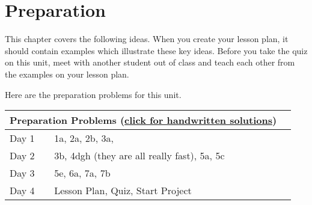 \section{Preparation}

\noindent
This chapter covers the following ideas. When you create your lesson plan, it should contain examples which illustrate these key ideas. Before you take the quiz on this unit, meet with another student out of class and teach each other from the examples on your lesson plan. 



Here are the preparation problems for this unit.

\begin{center}
\begin{tabular}{ll|l}
\multicolumn{2}{c}{Preparation Problems (\href{http://ilearn.byui.edu/bbcswebdav/institution/Physical\_Sci\_Eng/Mathematics/Personal\%20Folders/WoodruffB/341/6-Jordan-Form-Preparation-Solutions.pdf}{click for handwritten solutions})}
\\
\hline\hline
Day 1& 1a, 2a, 2b, 3a,
\\ \hline
Day 2& 3b, 4dgh (they are all really fast), 5a, 5c
\\ \hline
Day 3& 5e, 6a, 7a, 7b
\\ \hline
Day 4&
Lesson Plan,
Quiz, Start Project 
&
\\ \hline
\end{tabular}
\end{center}


